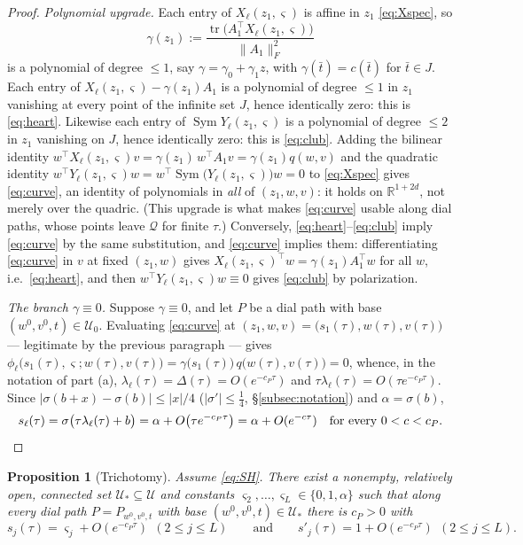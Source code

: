\documentclass[11pt]{article}
\newtheorem{proposition}[theorem]{Proposition}
\theoremstyle{definition}
\theoremstyle{remark}
\theoremstyle{plain}
\newcommand{\R}{\mathbb{R}}
\newcommand{\cQ}{\mathcal{Q}}
\newcommand{\cU}{\mathcal{U}}
\newcommand{\Sym}{\operatorname{Sym}}
\newcommand{\sig}{\sigma}
\begin{document}
\begin{proof}
\emph{Polynomial upgrade.}  Each entry of $X_\ell(z_1,\varsigma)$ is affine in $z_1$
\eqref{eq:Xspec}, so
\[
\gamma(z_1):=\frac{\operatorname{tr}\!\big(A_1^\top X_\ell(z_1,\varsigma)\big)}
{\|A_1\|_F^2}
\]
is a polynomial of degree $\le1$, say $\gamma=\gamma_0+\gamma_1z$, with
$\gamma(\bar t)=c(\bar t)$ for $\bar t\in J$.  Each entry of
$X_\ell(z_1,\varsigma)-\gamma(z_1)A_1$ is a polynomial of degree $\le1$ in $z_1$
vanishing at every point of the infinite set $J$, hence identically zero: this is
\eqref{eq:heart}.  Likewise each entry of $\Sym Y_\ell(z_1,\varsigma)$ is a polynomial
of degree $\le2$ in $z_1$ vanishing on $J$, hence identically zero: this is
\eqref{eq:club}.  Adding the bilinear identity
$w^\top X_\ell(z_1,\varsigma)v=\gamma(z_1)\,w^\top A_1v=\gamma(z_1)q(w,v)$ and the
quadratic identity $w^\top Y_\ell(z_1,\varsigma)w
=w^\top\Sym\big(Y_\ell(z_1,\varsigma)\big)w=0$ to \eqref{eq:Xspec} gives
\eqref{eq:curve}, an identity of polynomials in \emph{all} of $(z_1,w,v)$: it holds on
$\R^{1+2d}$, not merely over the quadric.  (This upgrade is what makes
\eqref{eq:curve} usable along dial paths, whose points leave $\cQ$ for finite $\tau$.)
Conversely, \eqref{eq:heart}--\eqref{eq:club} imply \eqref{eq:curve} by the same
substitution, and \eqref{eq:curve} implies them: differentiating \eqref{eq:curve} in
$v$ at fixed $(z_1,w)$ gives $X_\ell(z_1,\varsigma)^\top w=\gamma(z_1)A_1^\top w$ for
all $w$, i.e.\ \eqref{eq:heart}, and then $w^\top Y_\ell(z_1,\varsigma)w\equiv0$ gives
\eqref{eq:club} by polarization.

\emph{The branch $\gamma\equiv0$.}  Suppose $\gamma\equiv0$, and let $P$ be a dial
path with base $(w^0,v^0,t)\in\cU_0$.  Evaluating \eqref{eq:curve} at
$(z_1,w,v)=\big(s_1(\tau),w(\tau),v(\tau)\big)$ --- legitimate by the previous
paragraph --- gives
$\phi_\ell\big(s_1(\tau),\varsigma;w(\tau),v(\tau)\big)
=\gamma\big(s_1(\tau)\big)\,q\big(w(\tau),v(\tau)\big)=0$, whence, in the notation of
part (a), $\lambda_\ell(\tau)=\Delta(\tau)=O(e^{-c_P\tau})$ and
$\tau\lambda_\ell(\tau)=O(\tau e^{-c_P\tau})$.  Since
$|\sig(b+x)-\sig(b)|\le|x|/4$ ($|\sig'|\le\tfrac14$, \S\ref{subsec:notation}) and
$\alpha=\sig(b)$,
\[
s_\ell(\tau)=\sig\big(\tau\lambda_\ell(\tau)+b\big)
=\alpha+O\big(\tau e^{-c_P\tau}\big)=\alpha+O(e^{-c\tau})
\quad\text{for every }0<c<c_P. \qedhere
\]
\end{proof}

\begin{proposition}[Trichotomy]\label{prop:trichotomy}
Assume \eqref{eq:SH}.  There exist a nonempty, relatively open, connected set
$\cU_*\subseteq\cU$ and constants $\varsigma_2,\dots,\varsigma_L\in\{0,1,\alpha\}$ such
that along every dial path $P=P_{w^0,v^0,t}$ with base $(w^0,v^0,t)\in\cU_*$ there is
$c_P>0$ with
\[
s_j(\tau)=\varsigma_j+O(e^{-c_P\tau})\ \ (2\le j\le L)
\qquad\text{and}\qquad
s'_j(\tau)=1+O(e^{-c_P\tau})\ \ (2\le j\le L).
\]
\end{proposition}
\end{document}
